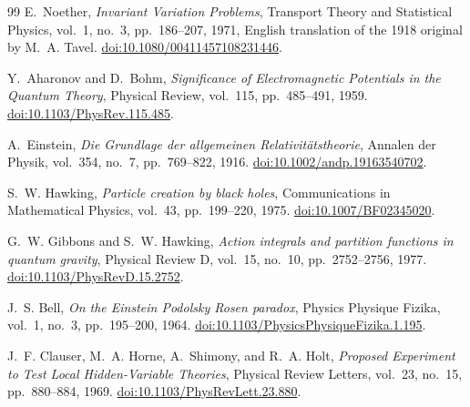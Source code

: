 \begin{thebibliography}{99}
E.~Noether,
\emph{Invariant Variation Problems},
Transport Theory and Statistical Physics, vol.~1, no.~3, pp.~186--207, 1971,
English translation of the 1918 original by M.~A. Tavel.
\href{https://doi.org/10.1080/00411457108231446}{doi:10.1080/00411457108231446}.

Y.~Aharonov and D.~Bohm,
\emph{Significance of Electromagnetic Potentials in the Quantum Theory},
Physical Review, vol.~115, pp.~485--491, 1959.
\href{https://doi.org/10.1103/PhysRev.115.485}{doi:10.1103/PhysRev.115.485}.

A.~Einstein,
\emph{Die Grundlage der allgemeinen Relativit\"atstheorie},
Annalen der Physik, vol.~354, no.~7, pp.~769--822, 1916.
\href{https://doi.org/10.1002/andp.19163540702}{doi:10.1002/andp.19163540702}.

S.~W. Hawking,
\emph{Particle creation by black holes},
Communications in Mathematical Physics, vol.~43, pp.~199--220, 1975.
\href{https://doi.org/10.1007/BF02345020}{doi:10.1007/BF02345020}.

G.~W. Gibbons and S.~W. Hawking,
\emph{Action integrals and partition functions in quantum gravity},
Physical Review D, vol.~15, no.~10, pp.~2752--2756, 1977.
\href{https://doi.org/10.1103/PhysRevD.15.2752}{doi:10.1103/PhysRevD.15.2752}.

J.~S. Bell,
\emph{On the Einstein Podolsky Rosen paradox},
Physics Physique Fizika, vol.~1, no.~3, pp.~195--200, 1964.
\href{https://doi.org/10.1103/PhysicsPhysiqueFizika.1.195}{doi:10.1103/PhysicsPhysiqueFizika.1.195}.

J.~F. Clauser, M.~A. Horne, A.~Shimony, and R.~A. Holt,
\emph{Proposed Experiment to Test Local Hidden-Variable Theories},
Physical Review Letters, vol.~23, no.~15, pp.~880--884, 1969.
\href{https://doi.org/10.1103/PhysRevLett.23.880}{doi:10.1103/PhysRevLett.23.880}.

\end{thebibliography}

